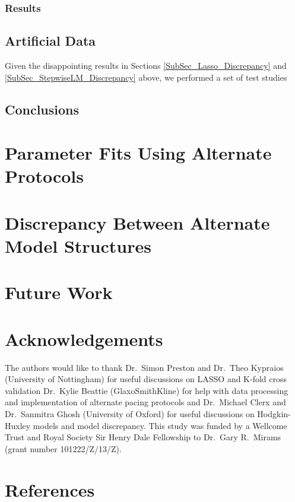 \documentclass[11pt,a4paper,oneside]{article}
\begin{document}
\subsubsection{Results}

\subsection{Artificial Data}
Given the disappointing results in Sections \ref{SubSec_Lasso_Discrepancy} and \ref{SubSec_StepwiseLM_Discrepancy} above, we performed a set of test studies 
\subsection{Conclusions}


\section{Parameter Fits Using Alternate Protocols}

\section{Discrepancy Between Alternate Model Structures}

\section{Future Work}

\section{Acknowledgements}
The authors would like to thank Dr.~Simon Preston and Dr.~Theo Kypraios (University of Nottingham) for useful discussions on LASSO and K-fold cross validation\; Dr.~Kylie Beattie (GlaxoSmithKline) for help with data processing and implementation of alternate pacing protocols\; and Dr.~Michael Clerx and Dr.~Sanmitra Ghosh (University of Oxford) for useful discussions on Hodgkin-Huxley models and model discrepancy. This study was funded by a Wellcome Trust and Royal Society Sir Henry Dale Fellowship to Dr.~Gary R.~Mirams (grant number 101222/Z/13/Z).

\section{References}


\end{document}
